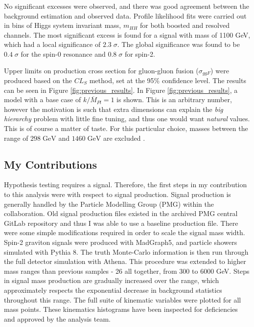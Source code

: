 \documentclass[12pt]{article}
\begin{document}
No significant excesses were observed, and there was good agreement between the
background estimation and observed data. Profile likelihood fits were carried
out in bins of Higgs system invariant mass, $m_{HH}$ for both boosted and
resolved channels. The most significant excess is found for a signal with mass
of 1100 GeV, which had a local significance of $2.3\;\sigma$. The global
significance was found to be $0.4\;\sigma$ for the spin-0 resonance and
$0.8\;\sigma$ for spin-2.

Upper limits on production cross section for gluon-gluon fusion ($\sigma_{ggF}$)
were produced based on the $CL_S$ method, set at the 95\% confidence level. The
results can be seen in Figure \ref{fig:previous_results}. In Figure
\ref{fig:previous_results}, a model with a base case of $k/\overline{M}_{Pl}=1$
is shown. This is an arbitrary number, however the motivation is such that extra
dimensions can explain the \textit{big hierarchy} problem with little fine
tuning, and thus one would want \textit{natural} values. This is of course a
matter of taste. For this particular choice, masses between the range of
$298\;\text{GeV}$ and $1460\;\text{GeV}$ are excluded
\cite{atlas_resonant_2022}. 


\subsection{My Contributions}

Hypothesis testing requires a signal. Therefore, the first steps in my
contribution to this analysis were with respect to signal production. Signal
production is generally handled by the Particle Modelling Group (PMG) within the
collaboration. Old signal production files existed in the archived PMG central
GitLab repository and thus I was able to use a baseline production file. There
were some simple modifications required in order to scale the signal mass width.
Spin-2 graviton signals were produced with MadGraph5, and particle showers
simulated with Pythia 8. The truth Monte-Carlo information is then run through
the full detector simulation with Athena. This procedure was extended to higher
mass ranges than previous samples - 26 all together, from 300 to 6000 GeV. Steps
in signal mass production are gradually increased over the range, which
approximately respects the exponential decrease in background statistics
throughout this range. The full suite of kinematic variables were plotted for
all mass points. These kinematics histograms have been inspected for
deficiencies and approved by the analysis team.
\end{document}
